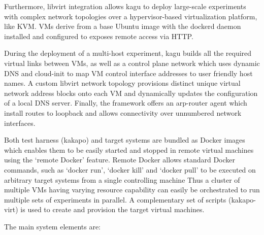 Furthermore, libvirt integration allows kagu to deploy large-scale experiments
with complex network topologies over a hypervisor-based virtualization
platform, like KVM. VMs derive from a base Ubuntu image with the dockerd
daemon installed and configured to exposes remote access via HTTP.

During the deployment of a multi-host experiment, kagu builds all the required
virtual links between VMs, as well as a control plane network which uses
dynamic DNS and cloud-init to map VM control interface addresses to user
friendly host names. A custom libvirt network topology provisions distinct
unique virtual network address blocks onto each VM and dynamically updates the
configuration of a local DNS server.  Finally, the framework offers an
arp-router agent which install routes to loopback and allows connectivity over
unnumbered network interfaces.

Both test harness (kakapo) and target systems are bundled as Docker images
which enables them to be easily started and stopped in remote virtual machines
using the ‘remote Docker’ feature.  Remote Docker allows standard Docker
commands, such as ‘docker run’, ‘docker kill’ and ‘docker pull’ to be executed
on arbitrary target systems from a single controlling machine  Thus a cluster
of multiple VMs having varying resource capability can easily be orchestrated
to run multiple sets of experiments in parallel.  A complementary set of
scripts (kakapo-virt) is used to create and provision the target virtual
machines.

The main system elements are:

